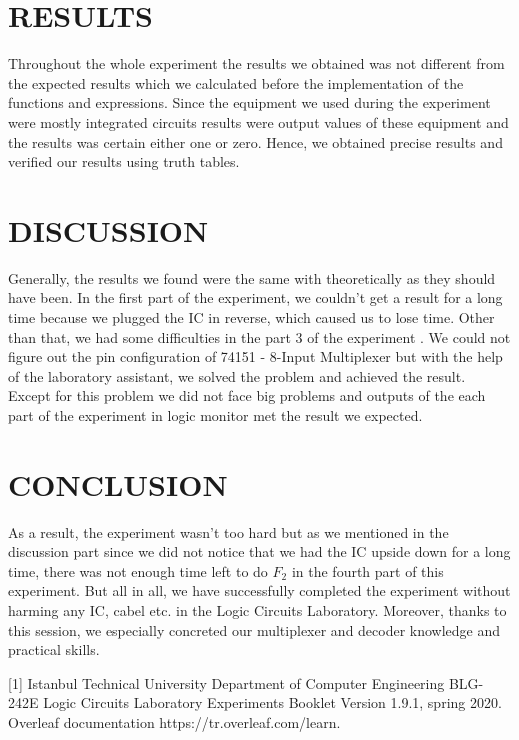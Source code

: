 \documentclass[pdftex,12pt,a4paper]{article}
\begin{document}
\clearpage
\section{RESULTS}
Throughout the whole experiment the results we obtained was not different from the expected results which we calculated before the implementation of the functions and expressions. Since the equipment we used during the experiment were mostly integrated circuits results were output values of these equipment and the results was certain either one or zero. Hence, we obtained precise results and verified our results using truth tables.


\section{DISCUSSION}
Generally, the results we found were the same with  theoretically as they should have been. In the first part of the experiment, we couldn't get a result for a long time because we plugged the IC in reverse, which caused us to lose time. Other than that, we had some difficulties in the part 3 of the experiment . We could not figure out the pin configuration of 74151 - 8-Input Multiplexer but with the help of the laboratory assistant, we solved the problem and achieved the result. Except for this problem we did not face big problems and outputs of the each part of the experiment in logic monitor met the result we expected.

\section{CONCLUSION}
As a result, the experiment wasn't too hard but as we mentioned in the discussion part since we did not notice that we had the IC upside down for a long time, there was not enough time left to do $F_{2}$ in the fourth part of this experiment. But all in all, we have successfully completed the experiment without harming any IC, cabel etc. in the Logic Circuits Laboratory. Moreover, thanks to this session, we especially concreted our multiplexer and decoder knowledge and practical skills.


\newpage
{}
[1] Istanbul Technical University Department of Computer Engineering BLG-242E Logic Circuits Laboratory Experiments Booklet Version 1.9.1, spring 2020.
\newline
[2] Overleaf documentation https://tr.overleaf.com/learn.



\end{document}
